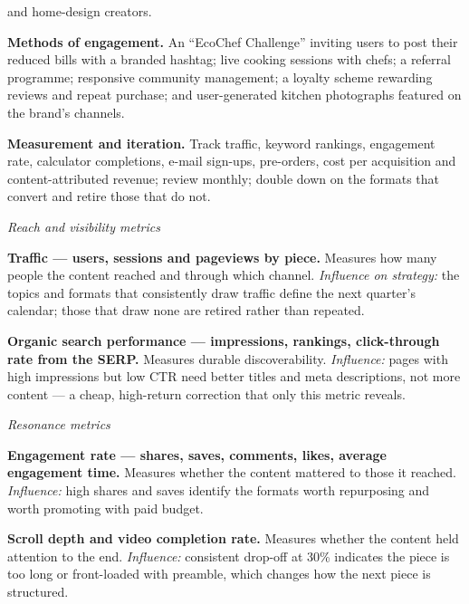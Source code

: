 \begin{qlist}
\begin{apts}
      and home-design creators.
\item \textbf{Methods of engagement.} An ``EcoChef Challenge'' inviting users to
      post their reduced bills with a branded hashtag; live cooking sessions
      with chefs; a referral programme; responsive community management; a
      loyalty scheme rewarding reviews and repeat purchase; and user-generated
      kitchen photographs featured on the brand's channels.
\item \textbf{Measurement and iteration.} Track traffic, keyword rankings,
      engagement rate, calculator completions, e-mail sign-ups, pre-orders, cost
      per acquisition and content-attributed revenue; review monthly; double
      down on the formats that convert and retire those that do not.
\end{apts}

\textit{Reach and visibility metrics}
\begin{apts}
\item \textbf{Traffic --- users, sessions and pageviews by piece.} Measures how
      many people the content reached and through which channel.
      \emph{Influence on strategy:} the topics and formats that consistently
      draw traffic define the next quarter's calendar; those that draw none are
      retired rather than repeated.
\item \textbf{Organic search performance --- impressions, rankings, click-through
      rate from the SERP.} Measures durable discoverability.
      \emph{Influence:} pages with high impressions but low CTR need better
      titles and meta descriptions, not more content --- a cheap, high-return
      correction that only this metric reveals.
\end{apts}

\textit{Resonance metrics}
\begin{apts}\setcounter{enumi}{2}
\item \textbf{Engagement rate --- shares, saves, comments, likes, average
      engagement time.} Measures whether the content mattered to those it
      reached. \emph{Influence:} high shares and saves identify the formats
      worth repurposing and worth promoting with paid budget.
\item \textbf{Scroll depth and video completion rate.} Measures whether the
      content held attention to the end. \emph{Influence:} consistent drop-off
      at 30\% indicates the piece is too long or front-loaded with preamble,
      which changes how the next piece is structured.
\end{apts}


\end{qlist}
